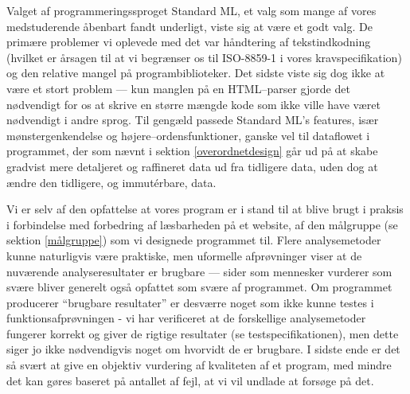 \documentclass[a4paper,oneside]{memoir}
\begin{document}
Valget af programmeringssproget Standard ML, et valg som mange af
vores medstuderende åbenbart fandt underligt, viste sig at være et
godt valg. De primære problemer vi oplevede med det var håndtering af
tekstindkodning (hvilket er årsagen til at vi begrænser os til
ISO-8859-1 i vores kravspecifikation) og den relative mangel på
programbiblioteker. Det sidste viste sig dog ikke at være et stort
problem --- kun manglen på en HTML--parser gjorde det nødvendigt for os
at skrive en større mængde kode som ikke ville have været nødvendigt i
andre sprog. Til gengæld passede Standard ML's features, især
mønstergenkendelse og højere--ordensfunktioner, ganske vel til
dataflowet i programmet, der som nævnt i sektion
\ref{overordnetdesign} går ud på at skabe gradvist mere detaljeret og
raffineret data ud fra tidligere data, uden dog at ændre den
tidligere, og immutérbare, data.

Vi er selv af den opfattelse at vores program er i stand til at blive
brugt i praksis i forbindelse med forbedring af læsbarheden på et
website, af den målgruppe (se sektion \ref{målgruppe}) som vi
designede programmet til. Flere analysemetoder kunne naturligvis være
praktiske, men uformelle afprøvninger viser at de nuværende
analyseresultater er brugbare --- sider som mennesker vurderer som
svære bliver generelt også opfattet som svære af programmet. Om
programmet producerer ``brugbare resultater'' er desværre noget som
ikke kunne testes i funktionsafprøvningen - vi har verificeret at de
forskellige analysemetoder fungerer korrekt og giver de rigtige
resultater (se testspecifikationen), men dette siger jo ikke
nødvendigvis noget om hvorvidt de er brugbare. I sidste ende er det så
svært at give en objektiv vurdering af kvaliteten af et program, med
mindre det kan gøres baseret på antallet af fejl, at vi vil undlade at
forsøge på det.
\end{document}
